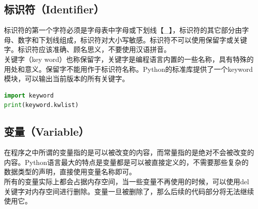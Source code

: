 \subsection{标识符（Identifier）}

标识符的第一个字符必须是字母表中字母或下划线【\_】，标识符的其它部分由字母、数字和下划线组成，标识符对大小写敏感。标识符不可以使用保留字或关键字。标识符应该准确、顾名思义，不要使用汉语拼音。 \\

关键字（key word）也称保留字，关键字是编程语言内置的一些名称，具有特殊的用处和意义。保留字不能用作于标识符名称。Python的标准库提供了一个keyword模块，可以输出当前版本的所有关键字。 \\


\begin{lstlisting}[language=Python]
import keyword
print(keyword.kwlist)
\end{lstlisting}

\begin{table}[H]
	\centering
	\caption{关键字}
\end{table}

\subsection{变量（Variable）}

在程序之中所谓的变量指的是可以被改变的内容，而常量指的是绝对不会被改变的内容。Python语言最大的特点是变量都是可以被直接定义的，不需要那些复杂的数据类型的声明，直接使用变量名称即可。 \\

所有的变量实际上都会占据内存空间，当一些变量不再使用的时候，可以使用del关键字对内存空间进行删除。变量一旦被删除了，那么后续的代码部分将无法继续使用它。 \\

